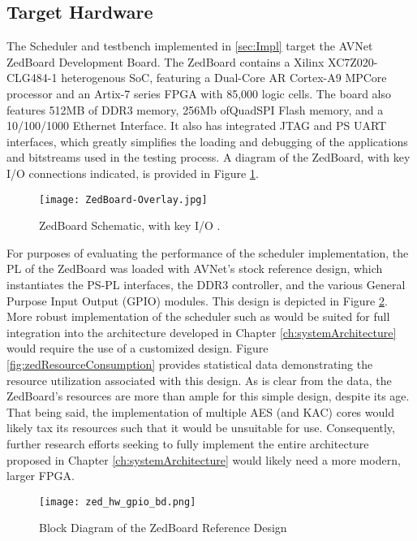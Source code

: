 \subsection{Target Hardware}\label{subsec:targetHW}
The Scheduler and testbench implemented in \ref{sec:Impl} target the AVNet ZedBoard Development Board. The ZedBoard contains a Xilinx XC7Z020-CLG484-1 heterogenous SoC, featuring a Dual-Core AR Cortex-A9 MPCore processor and an Artix-7 series FPGA with 85,000 logic cells. The board also features 512MB of DDR3 memory, 256Mb ofQuadSPI Flash memory, and a 10/100/1000 Ethernet Interface. It also has integrated JTAG and PS UART interfaces, which greatly simplifies the loading and debugging of the applications and bitstreams used in the testing process. A diagram of the ZedBoard, with key I/O connections indicated, is provided in Figure \ref{fig:zedImg}.

\begin{figure}[ht]
    \centering
    \texttt{[image: ZedBoard-Overlay.jpg]}
    \caption[ZedBoard Schematic]{ZedBoard Schematic, with key I/O \cite{noauthor_zedboard_nodate}.}
    \label{fig:zedImg}
\end{figure}

For purposes of evaluating the performance of the scheduler implementation, the PL of the ZedBoard was loaded with AVNet's stock reference design, which instantiates the PS-PL interfaces, the DDR3 controller, and the various General Purpose Input Output (GPIO) modules. This design is depicted in Figure \ref{fig:zedGPIODesign}. More robust implementation of the scheduler such as would be suited for full integration into the architecture developed in Chapter \ref{ch:systemArchitecture} would require the use of a customized design. Figure \ref{fig:zedResourceConsumption} provides statistical data demonstrating the resource utilization associated with this design. As is clear from the data, the ZedBoard's resources are more than ample for this simple design, despite its age. That being said, the implementation of multiple AES (and KAC) cores would likely tax its resources such that it would be unsuitable for use. Consequently, further research efforts seeking to fully implement the entire architecture proposed in Chapter \ref{ch:systemArchitecture} would likely need a more modern, larger FPGA.

\begin{figure}
    \centering
    \texttt{[image: zed\_hw\_gpio\_bd.png]}
    \caption[ZedBoard Reference Design]{Block Diagram of the ZedBoard Reference Design}
    \label{fig:zedGPIODesign}
\end{figure}

